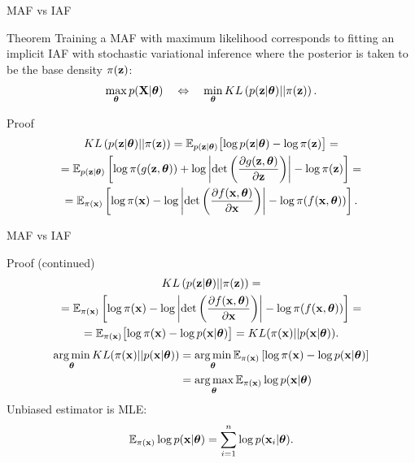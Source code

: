 \begin{frame}{MAF vs IAF}
	\begin{block}{Theorem}
		Training a MAF with maximum likelihood corresponds to fitting an implicit IAF  with stochastic variational inference where the posterior is taken to be the base density $\pi(\mathbf{z})$:
		\[  
		\max_{\boldsymbol{\theta}} p(\mathbf{X} | \boldsymbol{\theta}) \quad \Leftrightarrow \quad \min_{\boldsymbol{\theta}} KL\left(p(\mathbf{z} | \boldsymbol{\theta}) || \pi(\mathbf{z})\right).
		\]
		\vspace{-0.5cm}
	\end{block}
	\begin{block}{Proof}
		\vspace{-0.5cm}
		\begin{multline*}
			KL\left(p(\mathbf{z} | \boldsymbol{\theta}) || \pi(\mathbf{z}) \right) = \mathbb{E}_{p(\mathbf{z} | \boldsymbol{\theta})} \bigl[ \log p(\mathbf{z} | \boldsymbol{\theta}) - \log \pi(\mathbf{z}) \bigr] = \\ 
			= \mathbb{E}_{p(\mathbf{z} | \boldsymbol{\theta})} \left[ \log \pi(g(\mathbf{z}, \boldsymbol{\theta})) + \log \left| \det \left( \frac{\partial g(\mathbf{z}, \boldsymbol{\theta})}{\partial \mathbf{z}}\right) \right| - \log \pi(\mathbf{z}) \right] = \\
			= \mathbb{E}_{\pi(\mathbf{x})} \left[ \log \pi(\mathbf{x}) - \log \left| \det \left( \frac{\partial f(\mathbf{x}, \boldsymbol{\theta})}{\partial \mathbf{x}}\right) \right| - \log \pi(f(\mathbf{x}, \boldsymbol{\theta})) \right].
		\end{multline*}
	\end{block}
\end{frame}
\begin{frame}{MAF vs IAF}
	\begin{block}{Proof (continued)}
		\vspace{-0.5cm}
		\begin{multline*}
			KL\left(p(\mathbf{z} | \boldsymbol{\theta}) || \pi(\mathbf{z}) \right) = \\
			=  \mathbb{E}_{\pi(\mathbf{x})} \left[ \log \pi(\mathbf{x}) - \log \left| \det \left( \frac{\partial f(\mathbf{x}, \boldsymbol{\theta})}{\partial \mathbf{x}}\right) \right| - \log \pi(f(\mathbf{x}, \boldsymbol{\theta})) \right] = \\
			= \mathbb{E}_{\pi(\mathbf{x})} \bigl[ \log \pi(\mathbf{x}) - \log p(\mathbf{x} | \boldsymbol{\theta}) \bigr] = KL (\pi(\mathbf{x}) || p(\mathbf{x} | \boldsymbol{\theta})).
		\end{multline*}
		\begin{align*}
			\operatorname*{arg\,min}_{\boldsymbol{\theta}}  KL (\pi(\mathbf{x}) || p(\mathbf{x} | \boldsymbol{\theta})) &= \operatorname*{arg\,min}_{\boldsymbol{\theta}} \mathbb{E}_{\pi(\mathbf{x})} \left[ \log \pi(\mathbf{x}) - \log p(\mathbf{x} | \boldsymbol{\theta}) \right] \\
			&= \operatorname*{arg\,max}_{\boldsymbol{\theta}} \mathbb{E}_{\pi(\mathbf{x})} \log p(\mathbf{x} | \boldsymbol{\theta})
		\end{align*}
		Unbiased estimator is MLE:
		\vspace{-0.2cm}
		\[
		\mathbb{E}_{\pi(\mathbf{x})} \log p(\mathbf{x} | \boldsymbol{\theta}) = \sum_{i=1}^n \log p(\mathbf{x}_i | \boldsymbol{\theta}).
		\]
		\vspace{-0.3cm}
	\end{block}
\end{frame}
